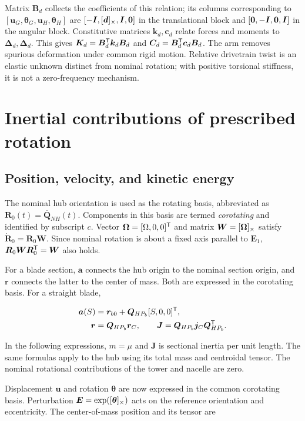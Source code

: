 Matrix $\bm B_d$ collects the coefficients of this relation; its columns corresponding to $[\bm u_G,\bm\theta_G,\bm u_H,\bm\theta_H]$ are $[-\bm I,[\bm{d}]_\times,\bm I,\bm0]$ in the translational block and $[\bm0,-\bm I,\bm0,\bm I]$ in the angular block. Constitutive matrices $\bm k_d,\bm c_d$ relate forces and moments to $\bm\Delta_d,\dot{\bm\Delta}_d$. This gives $\bm K_d=\bm B_d^\mathsf T\bm k_d\bm B_d$ and $\bm C_d=\bm B_d^\mathsf T\bm c_d\bm B_d$. The arm removes spurious deformation under common rigid motion. Relative drivetrain twist is an elastic unknown distinct from nominal rotation; with positive torsional stiffness, it is not a zero-frequency mechanism.

\FloatBarrier
\section{Inertial contributions of prescribed rotation}
\label{sec:giro}
\subsection{Position, velocity, and kinetic energy}
The nominal hub orientation is used as the rotating basis, abbreviated as $\bm R_0(t)=\overline{\bm Q}_{NH}(t)$. Components in this basis are termed \emph{corotating} and identified by subscript $c$. Vector $\bm\Omega=[\Omega,0,0]^\mathsf T$ and matrix $\bm W=[\bm{\Omega}]_\times$ satisfy $\dot{\bm R}_0=\bm R_0\bm W$. Since nominal rotation is about a fixed axis parallel to $\bm E_1$, $\bm R_0\bm W\bm R_0^\mathsf T=\bm W$ also holds.

For a blade section, $\bm a$ connects the hub origin to the nominal section origin, and $\bm r$ connects the latter to the center of mass. Both are expressed in the corotating basis. For a straight blade,

\begin{align}
\bm a(S)&=\bm r_{b0}+\bm Q_{HP_b}[S,0,0]^\mathsf T,\nonumber\\
\bm r&=\bm Q_{HP_b}\bm r_C,\qquad
\bm J=\bm Q_{HP_b}\bm j_C\bm Q_{HP_b}^\mathsf T.
\label{eq:datos-giro}
\end{align}

In the following expressions, $m=\mu$ and $\bm J$ is sectional inertia per unit length. The same formulas apply to the hub using its total mass and centroidal tensor. The nominal rotational contributions of the tower and nacelle are zero.

Displacement $\bm u$ and rotation $\bm\theta$ are now expressed in the common corotating basis. Perturbation $\bm E=\exp([\bm{\theta}]_\times)$ acts on the reference orientation and eccentricity. The center-of-mass position and its tensor are

